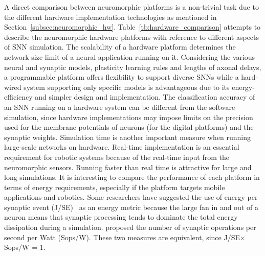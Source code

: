 A direct comparison between neuromorphic platforms is a non-trivial task due to the different hardware implementation technologies as mentioned in Section~\ref{subsec:neuromorphic_hw}.
Table~\ref{tb:hardware_comparison} attempts to describe the neuromorphic hardware platforms with reference to different aspects of SNN simulation.
The scalability of a hardware platform determines the network size limit of a neural application running on it.
Considering the various neural and synaptic models, plasticity learning rules and lengths of axonal delays, a programmable platform offers flexibility to support diverse SNNs while a hard-wired system supporting only specific models is advantageous due to its energy-efficiency and simpler design and implementation.
The classification accuracy of an SNN running on a hardware system can be different from the software simulation, since hardware implementations may impose limits on the precision used for the membrane potentials of neurons (for the digital platforms) and the synaptic weights.
Simulation time is another important measure when running large-scale networks on hardware.
Real-time implementation is an essential requirement for robotic systems because of the real-time input from the neuromorphic sensors.
Running faster than real time is attractive for large and long simulations.
It is interesting to compare the performance of each platform in terms of energy requirements, especially if the platform targets mobile applications and robotics.
Some researchers have suggested the use of energy per synaptic event (J/SE)~\citep{sharp2012power,stromatias2013power} as an energy metric because the large fan in and out of a neuron means that synaptic processing tends to dominate the total energy dissipation during a simulation.
\citet{merolla2014million} proposed the number of synaptic operations per second per Watt (Sops/W).
These two measures are equivalent, since J/SE$\times$Sops/W = 1.

